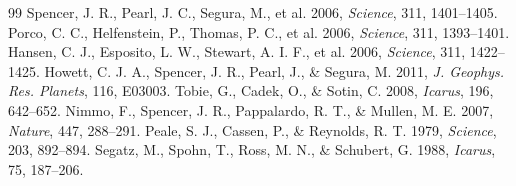 \documentclass[10pt,twocolumn,a4paper]{article}
\begin{document}
\begin{thebibliography}{99}
 Spencer, J. R., Pearl, J. C., Segura, M., et al. 2006, \textit{Science}, 311, 1401--1405.
 Porco, C. C., Helfenstein, P., Thomas, P. C., et al. 2006, \textit{Science}, 311, 1393--1401.
 Hansen, C. J., Esposito, L. W., Stewart, A. I. F., et al. 2006, \textit{Science}, 311, 1422--1425.
 Howett, C. J. A., Spencer, J. R., Pearl, J., \& Segura, M. 2011, \textit{J. Geophys. Res. Planets}, 116, E03003.
 Tobie, G., Cadek, O., \& Sotin, C. 2008, \textit{Icarus}, 196, 642--652.
 Nimmo, F., Spencer, J. R., Pappalardo, R. T., \& Mullen, M. E. 2007, \textit{Nature}, 447, 288--291.
 Peale, S. J., Cassen, P., \& Reynolds, R. T. 1979, \textit{Science}, 203, 892--894.
 Segatz, M., Spohn, T., Ross, M. N., \& Schubert, G. 1988, \textit{Icarus}, 75, 187--206.
\end{thebibliography}
\end{document}
